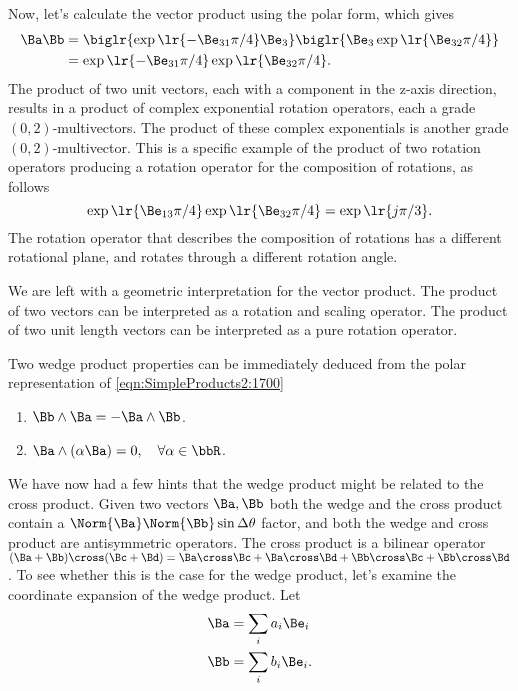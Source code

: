 {Now, let's calculate the vector product using the polar form, which gives
\begin{equation}\label{eqn:products:1960}
\begin{aligned}
\Ba \Bb
&= \biglr{ \exp\lr{ -\Be_{31} \pi/4 } \Be_3 } \biglr{ \Be_3 \exp\lr{ \Be_{32} \pi/4 } } \\
&= \exp\lr{ -\Be_{31} \pi/4 } \exp\lr{ \Be_{32} \pi/4 }.
\end{aligned}
\end{equation}
The product of two unit vectors, each with a component in the z-axis direction, results in a product of complex exponential rotation operators, each a
grade \((0,2)\)-multivectors.  The product of these complex exponentials is another grade \((0,2)\)-multivector.  This is a specific example of the product of two rotation operators producing a
rotation operator for the composition of rotations, as follows
\begin{equation}\label{eqn:products:1980}
\exp\lr{ \Be_{13} \pi/4 }
\exp\lr{ \Be_{32} \pi/4 } = \exp\lr{ j \pi/3 }.
\end{equation}
The rotation operator that describes the composition of rotations has a different rotational plane, and rotates through a different rotation angle.

We are left with a geometric interpretation for the vector product.  The product of two vectors can be interpreted as a rotation and scaling operator.
The product of two unit length vectors can be interpreted as a pure rotation operator.
} %

Two wedge product properties can be immediately deduced from the polar representation of \cref{eqn:SimpleProducts2:1700}

\begin{enumerate}
\item \( \Bb \wedge \Ba = - \Ba \wedge \Bb \).
\item \( \Ba \wedge (\alpha \Ba) = 0, \quad \forall \alpha \in \bbR \).
\end{enumerate}

We have now had a few hints that the wedge product might be related to the cross product.  Given two vectors \( \Ba, \Bb \) both the wedge and the cross product contain a \( \Norm{\Ba} \Norm{\Bb} \sin \Delta \theta \) factor, and both the wedge and cross product are antisymmetric operators.
The cross product is a bilinear operator \( (\Ba + \Bb) \cross (\Bc + \Bd) =
\Ba \cross \Bc + \Ba \cross \Bd +
\Bb \cross \Bc + \Bb \cross \Bd \).  To see whether this is the case for the wedge product, let's examine the coordinate expansion of the wedge product.  Let
\begin{equation}\label{eqn:products:1160}
\begin{aligned}
\Ba &= \sum_i a_i \Be_i \\
\Bb &= \sum_i b_i \Be_i.
\end{aligned}
\end{equation}

